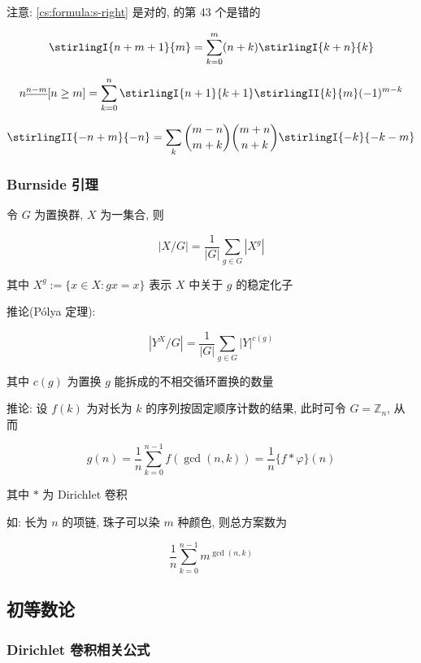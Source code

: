 注意: \eqref{cs:formula:s-right} 是对的,  的第 43 个是错的

\begin{equation}
    \label{cs:formula:s-right}
    \stirlingI{n+m+1}{m}=\sum_{k=0}^m(n+k)\stirlingI{k+n}{k}
\end{equation}

\begin{equation}
    n^{\underline{n-m}}[n\geq m]=\sum_{k=0}^n\stirlingI{n+1}{k+1}\stirlingII{k}{m}(-1)^{m-k}
\end{equation}

\begin{equation}
    \stirlingII{-n+m}{-n}=\sum_k\binom{m-n}{m+k}\binom{m+n}{n+k}\stirlingI{-k}{-k-m}
\end{equation}

\subsubsection{Burnside 引理}

令 \(G\) 为置换群, \(X\) 为一集合, 则

\[
    |X/G|=\frac{1}{|G|}\sum_{g\in G}\left|X^g\right|
\]

其中 \(X^g:=\{x\in X:gx=x\}\) 表示 \(X\) 中关于 \(g\) 的稳定化子

推论(P\'olya 定理):

\[
    \left|Y^X/G\right|=\frac{1}{|G|}\sum_{g\in G} |Y|^{c(g)}
\]

其中 \(c(g)\) 为置换 \(g\) 能拆成的不相交循环置换的数量

推论: 设 \(f(k)\) 为对长为 \(k\) 的序列按固定顺序计数的结果, 此时可令 \(G=\mathbb{Z}_n\), 从而

\[
    g(n)=\frac{1}{n}\sum_{k=0}^{n-1}f(\gcd(n,k))=\frac{1}{n} \{f*\varphi\}(n)
\]

其中 \(*\) 为 Dirichlet 卷积

如: 长为 \(n\) 的项链, 珠子可以染 \(m\) 种颜色, 则总方案数为

\[
    \frac{1}{n}\sum_{k=0}^{n-1} m^{\gcd(n,k)}
\]

\subsection{初等数论}

\subsubsection{Dirichlet 卷积相关公式}


